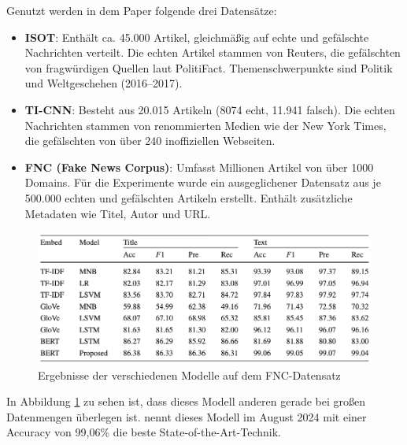 Genutzt werden in dem Paper folgende drei Datensätze:
\begin{itemize}
  \item \textbf{ISOT}: Enthält ca. 45.000 Artikel, gleichmäßig auf echte und gefälschte Nachrichten verteilt. 
  Die echten Artikel stammen von Reuters, die gefälschten von fragwürdigen Quellen laut PolitiFact. 
  Themenschwerpunkte sind Politik und Weltgeschehen (2016–2017).

  \item \textbf{TI-CNN}: Besteht aus 20.015 Artikeln (8074 echt, 11.941 falsch). Die echten Nachrichten stammen von renommierten Medien 
  wie der New York Times, die gefälschten von über 240 inoffiziellen Webseiten.

  \item \textbf{FNC (Fake News Corpus)}: Umfasst Millionen Artikel von über 1000 Domains. Für die Experimente wurde ein ausgeglichener 
  Datensatz aus je 500.000 echten und gefälschten Artikeln erstellt. Enthält zusätzliche Metadaten wie Titel, Autor und URL.
\end{itemize}

\begin{figure}[htbp]
    \begin{center}
    \includegraphics[scale=0.4]{static/bert_lightgbt_results.png}
    \caption{\label{fig:bert_lightgbt_results} Ergebnisse der verschiedenen Modelle auf dem FNC-Datensatz \cite{Essa:2023aa}}
    \end{center}
\end{figure}

In Abbildung \ref{fig:bert_lightgbt_results} zu sehen ist, dass dieses Modell anderen gerade bei großen Datenmengen überlegen ist.
\cite{Dhiman:2024aa} nennt dieses Modell im August 2024 mit einer Accuracy von 99,06\% die beste State-of-the-Art-Technik.

